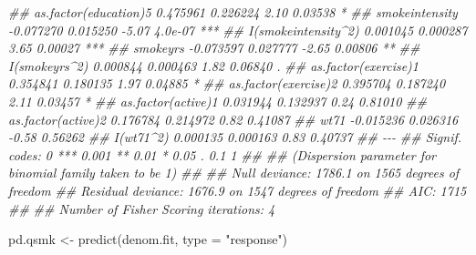 \documentclass[
  10pt,
  a4paper,
]{book}
\newenvironment{Shaded}{\begin{snugshade}}{\end{snugshade}}
\newcommand{\AttributeTok}[1]{\textcolor[rgb]{0.40,0.45,0.13}{#1}}
\newcommand{\DocumentationTok}[1]{\textcolor[rgb]{0.37,0.37,0.37}{\textit{#1}}}
\newcommand{\FunctionTok}[1]{\textcolor[rgb]{0.28,0.35,0.67}{#1}}
\newcommand{\NormalTok}[1]{\textcolor[rgb]{0.00,0.46,0.62}{#1}}
\newcommand{\OtherTok}[1]{\textcolor[rgb]{0.00,0.46,0.62}{#1}}
\newcommand{\StringTok}[1]{\textcolor[rgb]{0.13,0.47,0.30}{#1}}
\begin{document}
\begin{Shaded}
\begin{Highlighting}[]
\DocumentationTok{\#\# as.factor(education)5  0.475961   0.226224    2.10  0.03538 *  }
\DocumentationTok{\#\# smokeintensity        {-}0.077270   0.015250   {-}5.07  4.0e{-}07 ***}
\DocumentationTok{\#\# I(smokeintensity\^{}2)    0.001045   0.000287    3.65  0.00027 ***}
\DocumentationTok{\#\# smokeyrs              {-}0.073597   0.027777   {-}2.65  0.00806 ** }
\DocumentationTok{\#\# I(smokeyrs\^{}2)          0.000844   0.000463    1.82  0.06840 .  }
\DocumentationTok{\#\# as.factor(exercise)1   0.354841   0.180135    1.97  0.04885 *  }
\DocumentationTok{\#\# as.factor(exercise)2   0.395704   0.187240    2.11  0.03457 *  }
\DocumentationTok{\#\# as.factor(active)1     0.031944   0.132937    0.24  0.81010    }
\DocumentationTok{\#\# as.factor(active)2     0.176784   0.214972    0.82  0.41087    }
\DocumentationTok{\#\# wt71                  {-}0.015236   0.026316   {-}0.58  0.56262    }
\DocumentationTok{\#\# I(wt71\^{}2)              0.000135   0.000163    0.83  0.40737    }
\DocumentationTok{\#\# {-}{-}{-}}
\DocumentationTok{\#\# Signif. codes:  0 \textquotesingle{}***\textquotesingle{} 0.001 \textquotesingle{}**\textquotesingle{} 0.01 \textquotesingle{}*\textquotesingle{} 0.05 \textquotesingle{}.\textquotesingle{} 0.1 \textquotesingle{} \textquotesingle{} 1}
\DocumentationTok{\#\# }
\DocumentationTok{\#\# (Dispersion parameter for binomial family taken to be 1)}
\DocumentationTok{\#\# }
\DocumentationTok{\#\#     Null deviance: 1786.1  on 1565  degrees of freedom}
\DocumentationTok{\#\# Residual deviance: 1676.9  on 1547  degrees of freedom}
\DocumentationTok{\#\# AIC: 1715}
\DocumentationTok{\#\# }
\DocumentationTok{\#\# Number of Fisher Scoring iterations: 4}

\NormalTok{pd.qsmk }\OtherTok{\textless{}{-}} \FunctionTok{predict}\NormalTok{(denom.fit, }\AttributeTok{type =} \StringTok{"response"}\NormalTok{)}


\end{Highlighting}
\end{Shaded}
\end{document}
